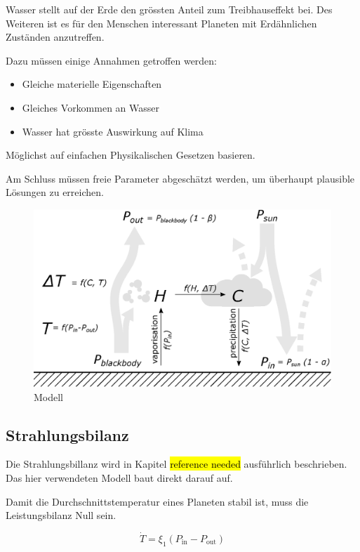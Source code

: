\begin{refsection}
Wasser stellt auf der Erde den grössten Anteil zum Treibhauseffekt bei.
Des Weiteren ist es für den Menschen interessant Planeten mit Erdähnlichen Zuständen anzutreffen.



 Dazu müssen einige Annahmen getroffen werden:
\begin{itemize}
	\item Gleiche materielle Eigenschaften
	\item Gleiches Vorkommen an Wasser
	\item Wasser hat grösste Auswirkung auf Klima
\end{itemize}			
	
	
Möglichst auf einfachen Physikalischen Gesetzen basieren.	
	
	
Am Schluss müssen freie Parameter abgeschätzt werden, um überhaupt plausible Lösungen zu erreichen.


\begin{figure}
	\centering
	\includegraphics[width=\textwidth]{planeten/Pictures/Model.eps}
	\caption{Modell}
\end{figure}

\subsection{Strahlungsbilanz}
Die Strahlungsbillanz wird in Kapitel \hl{reference needed} ausführlich beschrieben. Das hier verwendeten Modell baut direkt darauf auf.

Damit die Durchschnittstemperatur eines Planeten stabil ist, muss die Leistungsbilanz Null sein.

\begin{equation}
\dot{T} = \xi_1(P_{\text{in}} - P_{\text{out}})
\end{equation}


\end{refsection}
